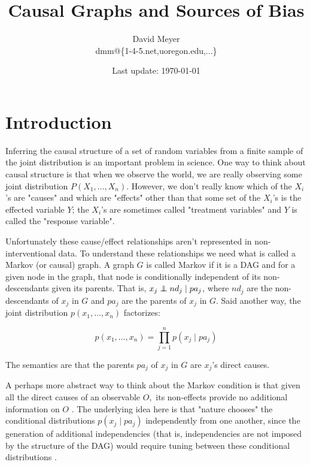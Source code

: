 \documentclass[11pt, oneside]{article}   	%
\title{Causal Graphs and Sources of  Bias}
\author{David Meyer \\ dmm@\{1-4-5.net,uoregon.edu,...\}}
\date{Last update: \today}							%
\newcommand\independent{\protect\mathpalette{\protect\independenT}{\perp}}
\def\independenT#1#2{\mathrel{\rlap{$#1#2$}\mkern2mu{#1#2}}}
\begin{document}
\maketitle


\section{Introduction} 
\label{sec:intro}
Inferring the causal structure of a set of random variables from a finite sample of the joint distribution is an important problem in science.
One way to think about causal structure is that when we observe the world, we are really observing some joint distribution
$P(X_1, \hdots, X_n)$. However, we don't really know which of the $X_i$'s are "causes" and which are "effects" other than that some set of the $X_i$'s is the effected variable $Y$;
the $X_i$'s are sometimes called "treatment variables" and $Y$ is called the "response variable". 

\bigskip
\noindent
Unfortunately these cause/effect relationships aren't represented in non-interventional data. To understand these relationships we need what is called
a Markov (or causal) graph. A graph $G$ is called Markov if it is a DAG and for a given node in the graph, that node is conditionally independent of its non-descendants 
given its parents. That is, $x_j \independent nd_j \mid  pa_j$, where $nd_j$ are the non-descendants of $x_j$ in $G$ 
and $pa_j$ are the parents of $x_j$ in $G$. Said another way,  the joint distribution $p(x_1,\hdots,x_n)$ factorizes: 

\begin{equation*}
p(x_1,\hdots,x_n) = \prod\limits_{j=1}^n p(x_j \mid pa_j) 
\end{equation*}

\bigskip
\noindent
The semantics are that the parents $pa_j$ of $x_j$ in $G$ are $x_j$'s direct causes.  


\bigskip
\noindent
A perhaps more abstract way to think about the Markov condition is that given all the direct causes of an observable $O,$ its non-effects provide 
no additional information on $O$ \cite{Peters:2014:CDC:2627435.2670315}.
The underlying idea here is that "nature chooses" the conditional distributions $p(x_j \mid pa_j)$ independently from one 
another, since the generation of additional independencies (that is, independencies are not imposed by the 
structure of the DAG) would require tuning between these conditional distributions \cite{Peters:2014:CDC:2627435.2670315}.
\end{document}
